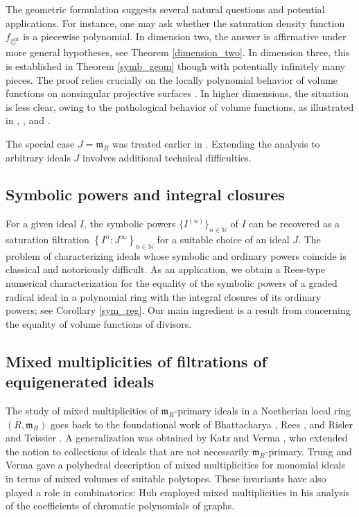 \documentclass[12pt,a4paper]{amsart}
\theoremstyle{plain}
\theoremstyle{definition}
\numberwithin{equation}{theorem}
\begin{document}
The geometric formulation suggests several natural questions and potential applications. For instance, one may ask whether the saturation density function $f_{\mathbb{I}^{\mathrm{sat}}_J}$ is a piecewise polynomial. In dimension two, the answer is affirmative under more general hypotheses, see Theorem \ref{dimension_two}. In dimension three, this is established in Theorem \ref{symb_geom} though with potentially infinitely many pieces. The proof relies crucially on the locally polynomial behavior of volume functions on nonsingular projective surfaces \cite{BKS04}. In higher dimensions, the situation is less clear, owing to the pathological behavior of volume functions, as illustrated in \cite{Cut86}, \cite{BKS04}, and \cite{KLM13}.

The special case $J=\mathfrak{m}_R$ was treated earlier in \cite{DRT25}. Extending the analysis to arbitrary ideals $J$ involves additional technical difficulties.

\subsection*{Symbolic powers and integral closures}
For a given ideal $I$, the symbolic powers $\{I^{(n)}\}_{n\in\mathbb{N}}$ of $I$ can be recovered as a saturation filtration $\left\{I^n \colon J^{\infty}\right\}_{n\in\mathbb{N}}$ for a suitable choice of an ideal $J$. The problem of characterizing ideals whose symbolic and ordinary powers coincide is classical and notoriously difficult. As an application, we obtain a Rees-type numerical characterization for the equality of the symbolic powers of a graded radical ideal in a polynomial ring with the integral closures of its ordinary powers; see Corollary \ref{sym_reg}. Our main ingredient is a result from \cite{FKL16} concerning the equality of volume functions of divisors.

\subsection*{Mixed multiplicities of filtrations of equigenerated ideals}
The study of mixed multiplicities of $\mathfrak{m}_R$-primary ideals in a Noetherian local ring $(R,\mathfrak{m}_R)$ goes back to the foundational work of Bhattacharya \cite{Bha57}, Rees \cite{Ree61b}, and Risler and Teissier \cite{Tei73}. A generalization was obtained by Katz and Verma \cite{KV89}, who extended the notion to collections of ideals that are not necessarily $\mathfrak{m}_R$-primary. Trung and Verma \cite{TV07} gave a polyhedral description of mixed multiplicities for monomial ideals in terms of mixed volumes of suitable polytopes. These invariants have also played a role in combinatorics: Huh \cite{Huh12} employed mixed multiplicities in his analysis of the coefficients of chromatic polynomials of graphs.
\end{document}
